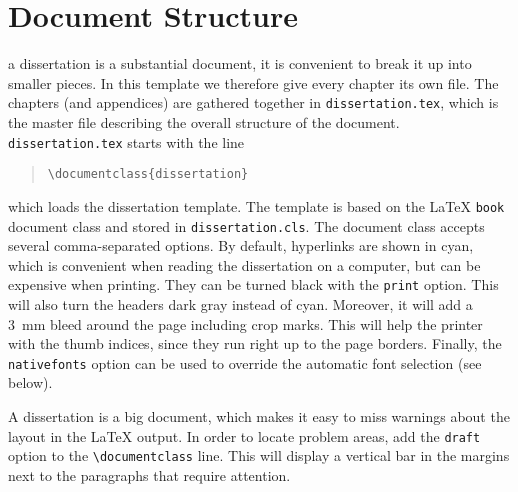 \section{Document Structure}

 a dissertation is a substantial document, it is convenient to break it up into smaller pieces.
In this template we therefore give every chapter its own file.
The chapters (and appendices) are gathered together in \texttt{dissertation.tex}, which is the master file describing the overall structure of the document.
\texttt{dissertation.tex} starts with the line

\begin{quote}
\texttt{\textbackslash documentclass\{dissertation\}}
\end{quote}
which loads the dissertation template.
The template is based on the \LaTeX{} \texttt{book} document class and stored in \texttt{dissertation.cls}.
The document class accepts several comma-separated options.
By default, hyperlinks are shown in cyan, which is convenient when reading the dissertation on a computer, but can be expensive when printing.
They can be turned black with the \texttt{print} option.
This will also turn the headers dark gray instead of cyan.
Moreover, it will add a 3~mm bleed around the page including crop marks.
This will help the printer with the thumb indices, since they run right up to the page borders.
Finally, the \texttt{nativefonts} option can be used to override the automatic font selection (see below).

A dissertation is a big document, which makes it easy to miss warnings about the layout in the \LaTeX{} output.
In order to locate problem areas, add the \texttt{draft} option to the \texttt{\textbackslash documentclass} line.
This will display a vertical bar in the margins next to the paragraphs that require attention.

